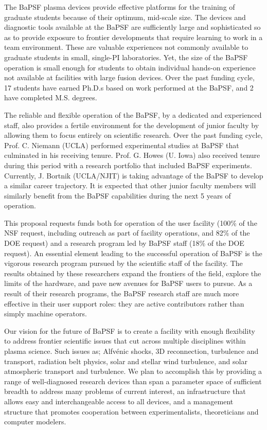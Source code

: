 \documentclass[11pt]{article}
\begin{document}
The BaPSF plasma devices provide effective platforms for the training
of graduate students because of their optimum, mid-scale size. The
devices and diagnostic tools available at the BaPSF are sufficiently
large and sophisticated so as to provide exposure to frontier
developments that require learning to work in a team
environment. These are valuable experiences not commonly available to
graduate students in small, single-PI laboratories. Yet, the size of
the BaPSF operation is small enough for students to obtain individual
hands-on experience not available at facilities with large fusion
devices. Over the past funding cycle, 17 students have earned Ph.D.s
based on work performed at the BaPSF, and 2 have completed
M.S. degrees.

The reliable and flexible operation of the BaPSF, by a dedicated and
experienced staff, also provides a fertile environment for the
development of junior faculty by allowing them to focus entirely on
scientific research. Over the past funding cycle, Prof. C. Niemann
(UCLA) performed experimental studies at BaPSF that culminated in his
receiving tenure. Prof. G. Howes (U. Iowa) also received tenure during
this period with a research portfolio that included BaPSF experiments.
Currently, J. Bortnik (UCLA/NJIT) is taking advantage of the BaPSF to develop
a similar career trajectory. It is expected that other junior faculty
members will similarly benefit from the BaPSF capabilities during the
next 5 years of operation.

This proposal requests funds both for operation of the user facility
(100\% of the NSF request, including outreach as part of facility
operations, and 82\% of the DOE request) and a research program led by
BaPSF staff (18\% of the DOE request).  An essential element leading
to the successful operation of BaPSF is the vigorous research program
pursued by the scientific staff of the facility. The results obtained
by these researchers expand the frontiers of the field, explore the
limits of the hardware, and pave new avenues for BaPSF users to
pursue. As a result of their research programs, the BaPSF research
staff are much more effective in their user support roles: they are
active contributors rather than simply machine operators.

Our vision for the future of BaPSF is to create a facility with enough
flexibility to address frontier scientific issues that cut across
multiple disciplines within plasma science. Such issues as; Alfv\'{e}nic
shocks, 3D reconnection, turbulence and transport, radiation belt
physics, solar and stellar wind turbulence, and solar atmospheric
transport and turbulence. We plan to accomplish this by providing a
range of well-diagnosed research devices than span a parameter space
of sufficient breadth to address many problems of current interest, an
infrastructure that allows easy and interchangeable access to all
devices, and a management structure that promotes cooperation between
experimentalists, theoreticians and computer modelers.
\end{document}
